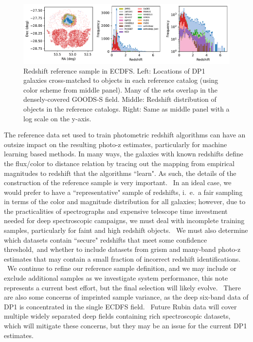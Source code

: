 \begin{figure}[b]
    \centering
    \includegraphics[width=\linewidth]{figures/redshift_reference_cat.pdf}
    \caption{
        Redshift reference sample in ECDFS.
        Left: Locations of DP1 galaxies cross-matched to objects in each reference catalog (using color scheme from middle panel).
        Many of the sets overlap in the densely-covered GOODS-S field.
        Middle: Redshift distribution of objects in the reference catalogs.
        Right: Same as middle panel with a log scale on the y-axis.
    }
    \label{fig:reference-sample}
\end{figure}

The reference data set used to train photometric redshift algorithms can have an outsize impact on the resulting photo-z estimates, particularly for machine learning based methods.  In many ways, the galaxies with known redshifts define the flux/color to distance relation by tracing out the mapping from empirical magnitudes to redshift that the algorithms ``learn".  As such, the details of the construction of the reference sample is very important.  In an ideal case, we would prefer to have a ``representative" sample of redshifts, i.~e.~a fair sampling in terms of the color and magnitude distribution for all galaxies; however, due to the practicalities of spectrographs and expensive telescope time investment needed for deep spectroscopic campaigns, we must deal with incomplete training samples, particularly for faint and high redshift objects.  We must also determine which datasets contain ``secure" redshifts that meet some confidence threshold, and whether to include datasets from grism and many-band photo-z estimates that may contain a small fraction of incorrect redshift identifications.  We continue to refine our reference sample definition, and we may include or exclude additional samples as we investigate system performance, this note represents a current best effort, but the final selection will likely evolve.  There are also some concerns of imprinted sample variance, as the deep six-band data of DP1 is concentrated in the single ECDFS field.  Future Rubin data will cover multiple widely separated deep fields containing rich spectroscopic datasets, which will mitigate these concerns, but they may be an issue for the current DP1 estimates.  


